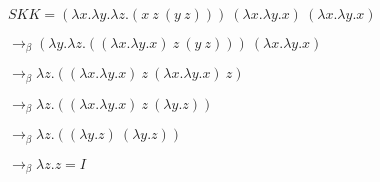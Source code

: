 \documentclass{article}
\begin{document}
$S K K = (\lambda x. \lambda y. \lambda z.(x\ z\ (y\ z)))\ (\lambda x. \lambda y.x)\ (\lambda x. \lambda y.x)$

$\rightarrow_\beta (\lambda y. \lambda z.((\lambda x. \lambda y.x)\ z\ (y\ z)))\ (\lambda x. \lambda y.x)$

$\rightarrow_\beta \lambda z.((\lambda x. \lambda y.x)\ z\ (\lambda x. \lambda y.x)\ z)$

$\rightarrow_\beta \lambda z.((\lambda x. \lambda y.x)\ z\ (\lambda y.z))$

$\rightarrow_\beta \lambda z.((\lambda y.z)\ (\lambda y.z))$

$\rightarrow_\beta \lambda z.z = I$
\end{document}
